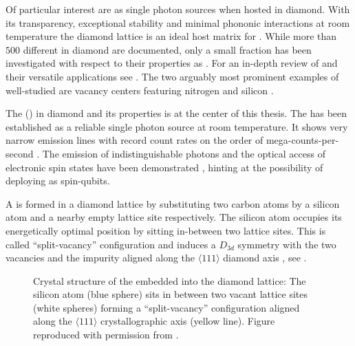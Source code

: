   Of particular interest are \ccs as single photon sources when hosted in diamond. With its transparency, exceptional stability and minimal phononic interactions at room temperature the diamond lattice is an ideal host matrix for \ccs \cite{Kennedy2003,Greentree2008}. While more than $500$ different \ccs in diamond are documented, only a small fraction has been investigated with respect to their properties as \spss \cite{Zaitsev2001}. For an in-depth review of \ccs and their versatile applications see \cite{Aharonovich2014, Prawer2014}. The two arguably most prominent examples of well-studied \ccs are vacancy centers featuring nitrogen and silicon \cite{Manson2006, Jelezko2002, Santori2006}.

  The \sivc (\siv) in diamond and its properties is at the center of this thesis. The \siv has been established as a reliable single photon source at room temperature. It shows very narrow emission lines with record count rates on the order of mega-counts-per-second \cite{Neu2012a}. The emission of indistinguishable photons and the optical access of electronic spin states have been demonstrated \cite{Sipahigil2014, Mueller2014, Pingault2014, Rogers2014a}, hinting at the possibility of deploying \sivs as spin-qubits.

  A \sivc is formed in a diamond lattice by substituting two carbon atoms by a silicon atom and a nearby empty lattice site respectively. The silicon atom occupies its energetically optimal position by sitting in-between two lattice sites. This is called ``split-vacancy'' configuration and induces a $D_{3d}$ symmetry with the two vacancies and the impurity aligned along the $\langle 111 \rangle$ diamond axis \cite{Goss2007}, see .

  \begin{figure}[htbp]
		\centering
		\caption[Split-vacancy configuration for \sivs in diamond]{Crystal structure of the \siv embedded into the diamond lattice: The silicon atom (blue sphere) sits in between two vacant lattice sites (white spheres) forming a ``split-vacancy'' configuration aligned along the $\langle 111 \rangle$ crystallographic axis (yellow line). Figure reproduced with permission from \cite{Riedrich-moller2014}.}
		\label{fig::siv_lattice}
	\end{figure}


